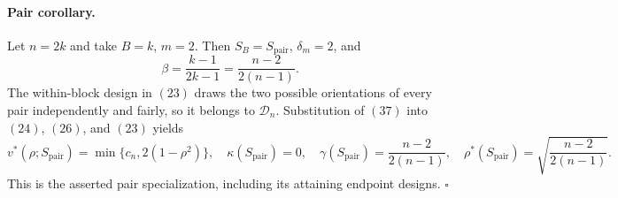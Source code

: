 \paragraph{Pair corollary.}
Let \(n=2k\) and take \(B=k\), \(m=2\).  Then \(S_B=S_{\mathrm{pair}}\), \(\delta_m=2\), and
\[
\beta=\frac{k-1}{2k-1}=\frac{n-2}{2(n-1)}.
\tag{37}
\]
The within-block design in \((23)\) draws the two possible orientations of every pair independently and fairly, so it belongs to \(\mathcal D_n\).  Substitution of \((37)\) into \((24)\), \((26)\), and \((23)\) yields
\[
v^*(\rho;S_{\mathrm{pair}})
=\min\{c_n,2(1-\rho^2)\},
\quad
\kappa(S_{\mathrm{pair}})=0,
\quad
\gamma(S_{\mathrm{pair}})=\frac{n-2}{2(n-1)},
\quad
\rho^*(S_{\mathrm{pair}})=\sqrt{\frac{n-2}{2(n-1)}}.
\tag{38}
\]
This is the asserted pair specialization, including its attaining endpoint designs.  \(\square\)